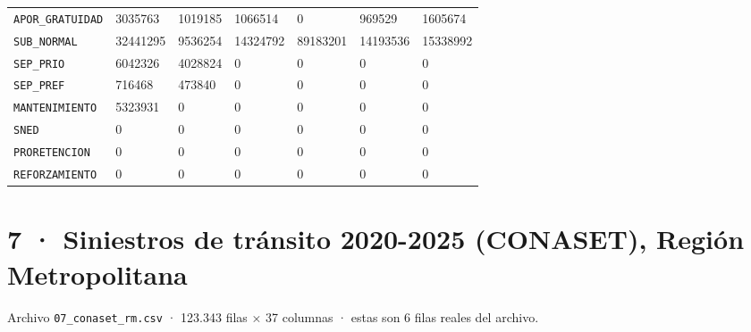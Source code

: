 \documentclass[10pt]{article}
\begin{document}
\begin{xltabular}{\linewidth}{@{}p{4.3cm} Y Y Y Y Y Y @{}}
\texttt{APOR\_\allowbreak{}GRATUIDAD} & 3035763 & 1019185 & 1066514 & 0 & 969529 & 1605674 \\
\texttt{SUB\_\allowbreak{}NORMAL} & 32441295 & 9536254 & 14324792 & 89183201 & 14193536 & 15338992 \\
\texttt{SEP\_\allowbreak{}PRIO} & 6042326 & 4028824 & 0 & 0 & 0 & 0 \\
\texttt{SEP\_\allowbreak{}PREF} & 716468 & 473840 & 0 & 0 & 0 & 0 \\
\texttt{MANTENIMIENTO} & 5323931 & 0 & 0 & 0 & 0 & 0 \\
\texttt{SNED} & 0 & 0 & 0 & 0 & 0 & 0 \\
\texttt{PRORETENCION} & 0 & 0 & 0 & 0 & 0 & 0 \\
\texttt{REFORZAMIENTO} & 0 & 0 & 0 & 0 & 0 & 0 \\
\end{xltabular}
\normalsize

\clearpage
\hypertarget{base7}{}
\section{7 · Siniestros de tránsito 2020-{}2025 (CONASET), Región Metropolitana}
\small Archivo \texttt{07\_conaset\_rm.csv} · 123.343 filas × 37 columnas · estas son 6 filas reales del archivo.\normalsize
\end{document}
